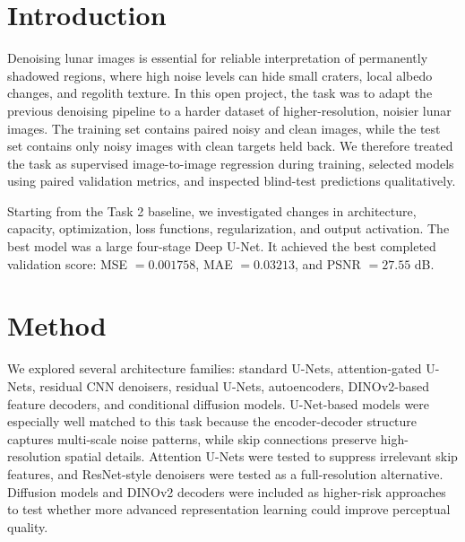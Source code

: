 \documentclass[a4paper,10pt]{article}
\begin{document}

% 

\setcounter{page}{1}
\section{Introduction}
Denoising lunar images is essential for reliable interpretation of permanently shadowed regions, where high noise levels can hide small craters, local albedo changes, and regolith texture. In this open project, the task was to adapt the previous denoising pipeline to a harder dataset of higher-resolution, noisier lunar images. The training set contains paired noisy and clean images, while the test set contains only noisy images with clean targets held back. We therefore treated the task as supervised image-to-image regression during training, selected models using paired validation metrics, and inspected blind-test predictions qualitatively.

Starting from the Task 2 baseline, we investigated changes in architecture, capacity, optimization, loss functions, regularization, and output activation. The best model was a large four-stage Deep U-Net. It achieved the best completed validation score: MSE $=0.001758$, MAE $=0.03213$, and PSNR $=27.55$ dB.

\section{Method}
We explored several architecture families: standard U-Nets, attention-gated U-Nets, residual CNN denoisers, residual U-Nets, autoencoders, DINOv2-based feature decoders, and conditional diffusion models. U-Net-based models were especially well matched to this task because the encoder-decoder structure captures multi-scale noise patterns, while skip connections preserve high-resolution spatial details. Attention U-Nets were tested to suppress irrelevant skip features, and ResNet-style denoisers were tested as a full-resolution alternative. Diffusion models and DINOv2 decoders were included as higher-risk approaches to test whether more advanced representation learning could improve perceptual quality.
\end{document}
